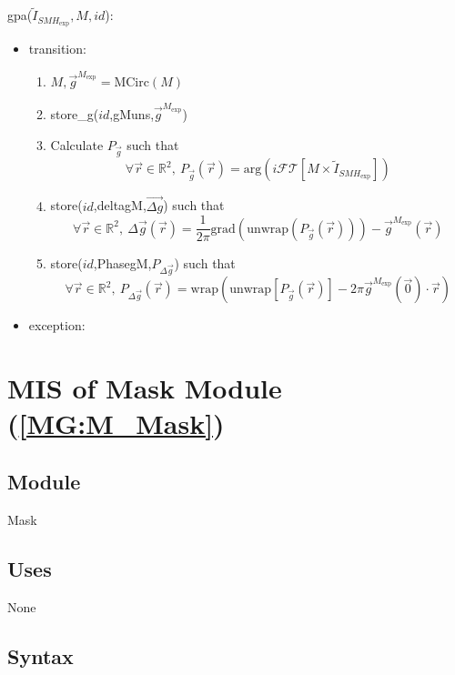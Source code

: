 \documentclass[12pt, titlepage]{article}
\begin{document}
\noindent gpa($\widetilde{I}_{\mathit{SMH}_{\text{exp}}},M,id$):
\begin{itemize} 
\item transition: 
	\begin{enumerate}
	\item $M,\overrightarrow{g}^{M_{\text{exp}}}=\text{MCirc}(M)$
	\item store{\_}g($id$,gMuns,$\overrightarrow{g}^{M_{\text{exp}}}$)
	\item Calculate $P_{\vec{g}}$ such that
	\begin{equation*}
	\forall \vec{r} \in \mathbb{R}^2, \ P_{\vec{g}}(\vec{r})=\text{arg}(i\mathcal{FT}[M\times\widetilde{I}_{\mathit{SMH}_{\text{exp}}}])
	\end{equation*}
	\item store($id$,deltagM,$\overrightarrow{\Delta g}$) such that
	\begin{equation*}
	\forall \vec{r} \in \mathbb{R}^2, \ \Delta \overrightarrow{g}(\vec{r})=\frac{1}{2\pi}\text{grad}(\text{unwrap}(P_{\vec{g}}(\vec{r})))-\overrightarrow{g}^{M_{\text{exp}}}(\vec{r})
	\end{equation*}
	\item store($id$,PhasegM,$P_{\Delta \vec{g}}$) such that
	\begin{equation*}
	\forall \vec{r} \in \mathbb{R}^2, \ P_{\Delta \vec{g}}(\vec{r})=\text{wrap}(\text{unwrap}[P_{\vec{g}}(\vec{r})]-2\pi\overrightarrow{g}^{M_{\text{exp}}}(\vec{0})\cdot \vec{r})
	\end{equation*}
	\end{enumerate}
\item exception:  
\end{itemize}

\section{MIS of Mask Module (\texorpdfstring{\cref{MG:M_Mask}}))} \label{MIS_Mask}

\subsection{Module}
Mask
\subsection{Uses}
None

\subsection{Syntax}
\end{document}
